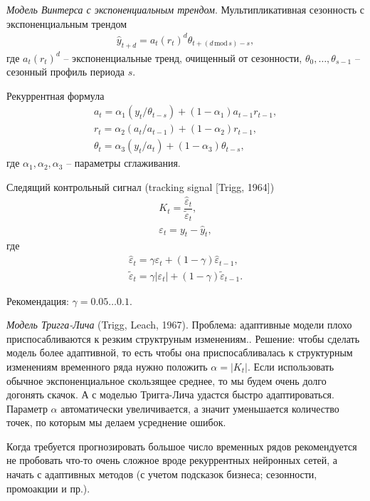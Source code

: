 \documentclass[%
	11pt,
	a4paper,
	utf8,
		]{article}
\begin{document}
\emph{Модель Винтерса с экспоненциальным трендом}. Мультипликативная сезонность с экспоненциальным трендом
\begin{align*}
	\hat{y}_{t + d} = a_t (r_t)^d \theta_{t + (d \, \text{mod} \, s) - s},
\end{align*}
где $ a_t(r_t)^d $ -- экспоненциальные тренд, очищенный от сезонности, $ \theta_0, \ldots, \theta_{s - 1} $ -- сезонный профиль периода $ s $.

Рекуррентная формула
\begin{align*}
	a_t = \alpha_1 (y_t / \theta_{t - s}) + (1 - \alpha_1) a_{t - 1} r_{t - 1},\\
	r_t = \alpha_2 (a_t / a_{t - 1}) + (1 - \alpha_2) r_{t - 1}, \\
	\theta_t = \alpha_3 (y_t / a_t) + (1 - \alpha_3) \theta_{t - s},
\end{align*}
где $ \alpha_1, \alpha_2, \alpha_3 $ -- параметры сглаживания.

Следящий контрольный сигнал (tracking signal [Trigg, 1964])
\begin{align*}
	K_t = \dfrac{\hat{\varepsilon}_t}{\tilde{\varepsilon}_t},\\
	\varepsilon_t = y_t - \hat{y}_t,
\end{align*}
где
\begin{align*}
	\hat{\varepsilon}_t = \gamma \varepsilon_t + (1 - \gamma) \hat{\varepsilon}_{t - 1},\\
	\tilde{\varepsilon}_t = \gamma |\varepsilon_t| + (1 - \gamma) \tilde{\varepsilon}_{t - 1}.
\end{align*}

Рекомендация: $ \gamma = 0.05 \ldots 0.1 $.

\emph{Модель Тригга-Лича} (Trigg, Leach, 1967). {\color{red}Проблема: адаптивные модели плохо приспосабливаются к резким структруным изменениям.}. Решение: чтобы сделать модель более адаптивной, то есть чтобы она приспосабливалась к структурным изменениям временного ряда нужно положить $ \alpha = |K_t| $. Если использовать обычное экспоненциальное скользящее среднее, то мы будем очень долго догонять скачок. А с моделью Тригга-Лича удастся быстро адаптироваться. Параметр $ \alpha $ автоматически увеличивается, а значит уменьшается количество точек, по которым мы делаем  усреднение ошибок.

Когда требуется прогнозировать большое число временных рядов рекомендуется не пробовать что-то очень сложное вроде рекуррентных нейронных сетей, а начать с адаптивных методов (с учетом подсказок бизнеса; сезонности, промоакции и пр.).
\end{document}
